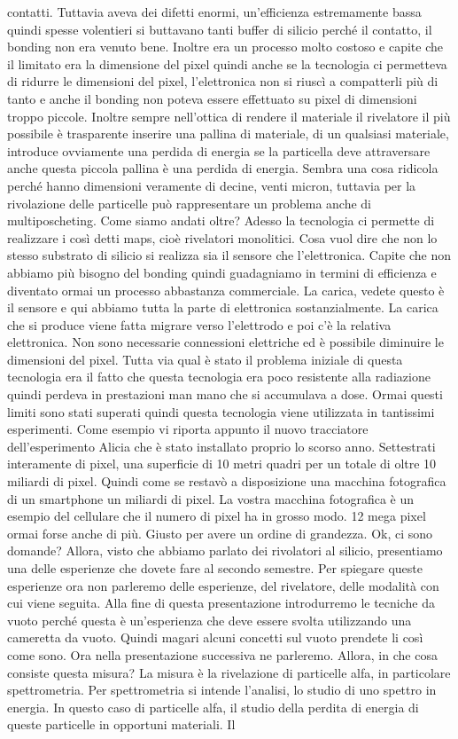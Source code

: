 contatti. Tuttavia aveva dei difetti enormi, un'efficienza estremamente bassa quindi spesse volentieri si buttavano tanti buffer di silicio perché il contatto, il bonding non era venuto bene. Inoltre era un processo molto costoso e capite che il limitato era la dimensione del pixel quindi anche se la tecnologia ci permetteva di ridurre le dimensioni del pixel, l'elettronica non si riuscì a compatterli più di tanto e anche il bonding non poteva essere effettuato su pixel di dimensioni troppo piccole. Inoltre sempre nell'ottica di rendere il materiale il rivelatore il più possibile è trasparente inserire una pallina di materiale, di un qualsiasi materiale, introduce ovviamente una perdida di energia se la particella deve attraversare anche questa piccola pallina è una perdida di energia. Sembra una cosa ridicola perché hanno dimensioni veramente di decine, venti micron, tuttavia per la rivolazione delle particelle può rappresentare un problema anche di multiposcheting. Come siamo andati oltre? Adesso la tecnologia ci permette di realizzare i così detti maps, cioè rivelatori monolitici. Cosa vuol dire che non lo stesso substrato di silicio si realizza sia il sensore che l'elettronica. Capite che non abbiamo più bisogno del bonding quindi guadagniamo in termini di efficienza e diventato ormai un processo abbastanza commerciale. La carica, vedete questo è il sensore e qui abbiamo tutta la parte di elettronica sostanzialmente. La carica che si produce viene fatta migrare verso l'elettrodo e poi c'è la relativa elettronica. Non sono necessarie connessioni elettriche ed è possibile diminuire le dimensioni del pixel. Tutta via qual è stato il problema iniziale di questa tecnologia era il fatto che questa tecnologia era poco resistente alla radiazione quindi perdeva in prestazioni man mano che si accumulava a dose. Ormai questi limiti sono stati superati quindi questa tecnologia viene utilizzata in tantissimi esperimenti. Come esempio vi riporta appunto il nuovo tracciatore dell'esperimento Alicia che è stato installato proprio lo scorso anno. Settestrati interamente di pixel, una superficie di 10 metri quadri per un totale di oltre 10 miliardi di pixel. Quindi come se restavò a disposizione una macchina fotografica di un smartphone un miliardi di pixel. La vostra macchina fotografica è un esempio del cellulare che il numero di pixel ha in grosso modo. 12 mega pixel ormai forse anche di più. Giusto per avere un ordine di grandezza. Ok, ci sono domande? Allora, visto che abbiamo parlato dei rivolatori al silicio, presentiamo una delle esperienze che dovete fare al secondo semestre. Per spiegare queste esperienze ora non parleremo delle esperienze, del rivelatore, delle modalità con cui viene seguita. Alla fine di questa presentazione introdurremo le tecniche da vuoto perché questa è un'esperienza che deve essere svolta utilizzando una cameretta da vuoto. Quindi magari alcuni concetti sul vuoto prendete li così come sono. Ora nella presentazione successiva ne parleremo. Allora, in che cosa consiste questa misura? La misura è la rivelazione di particelle alfa, in particolare spettrometria. Per spettrometria si intende l'analisi, lo studio di uno spettro in energia. In questo caso di particelle alfa, il studio della perdita di energia di queste particelle in opportuni materiali. Il 